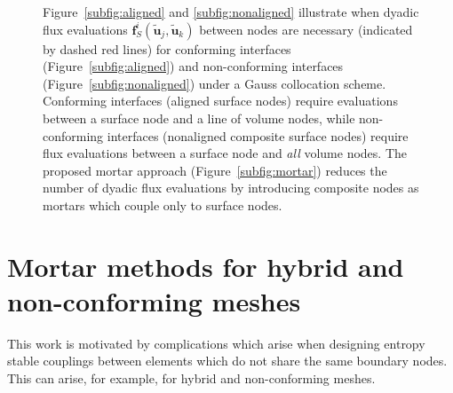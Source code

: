 \documentclass[review]{siamart0216}
\renewcommand{\tilde}{\widetilde}
\newcommand{\LRp}[1]{\left( #1 \right)}
\begin{document}
\begin{figure}
\centering
{}
\hspace{4em}
\caption{Figure~\ref{subfig:aligned} and \ref{subfig:nonaligned} illustrate when dyadic flux evaluations $\bm{f}^i_S\LRp{\tilde{\bm{u}}_j,\tilde{\bm{u}}_k}$ between nodes are necessary (indicated by dashed red lines) for conforming interfaces (Figure~\ref{subfig:aligned}) and non-conforming interfaces (Figure~\ref{subfig:nonaligned}) under a Gauss collocation scheme.  Conforming interfaces (aligned surface nodes) require evaluations between a surface node and a line of volume nodes, while non-conforming interfaces (nonaligned composite surface nodes) require flux evaluations between a surface node and \textit{all} volume nodes.  The proposed mortar approach (Figure~\ref{subfig:mortar}) reduces the number of dyadic flux evaluations by introducing composite nodes as mortars which couple only to surface nodes. }
\label{fig:fluxsparsity}
\end{figure}


\section{Mortar methods for hybrid and non-conforming meshes}

This work is motivated by complications which arise when designing entropy stable couplings between elements which do not share the same boundary nodes.  This can arise, for example, for hybrid and non-conforming meshes.  
\end{document}
